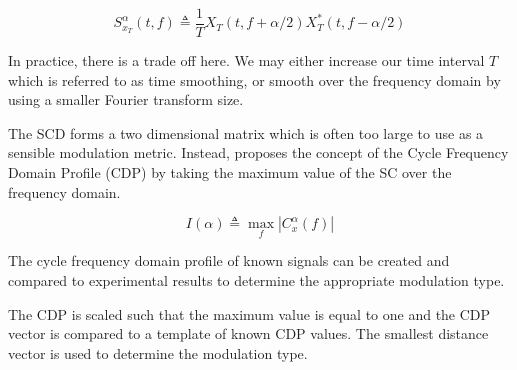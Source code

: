 \begin{equation}
S_{x_T}^{\alpha}(t,f) \triangleq \frac{1}{T} X_T(t,f + \alpha / 2)X_T^*(t,f - \alpha / 2)
\label{eq:ScdDefined2}
\end{equation}

In practice, there is a trade off here.  We may either increase our time
interval $T$ which is referred to as time smoothing, or smooth over the frequency
domain by using a smaller Fourier transform size.

The SCD forms a two dimensional matrix which is often
too large to use as a sensible modulation metric.  Instead, \cite{kim2007}
proposes the concept of the Cycle Frequency Domain Profile (CDP) by taking the
maximum value of the SC over the frequency domain.

\begin{equation}
I(\alpha) \triangleq \max_f |C_x^{\alpha}(f)|
\label{eq:CdpDef}
\end{equation}

The cycle frequency domain profile of known signals can be created and compared
to experimental results to determine the appropriate modulation type.  

\begin{comment}
This method is dumb, I should determine the number of peaks or something and
compare peak location and size.
\end{comment}


The CDP is scaled such that the maximum value is equal to one and the CDP vector
is compared to a template of known CDP values.  The smallest distance vector is
used to determine the modulation type.

